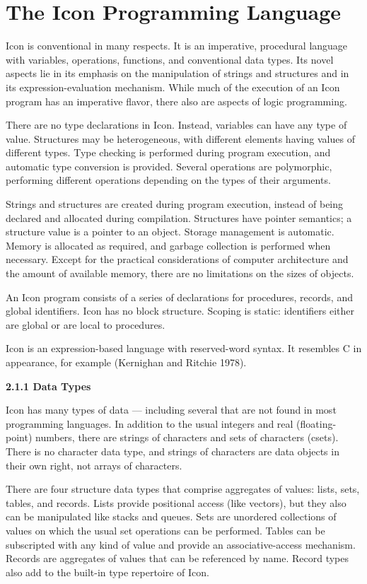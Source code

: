 \section{The Icon Programming Language}

Icon is conventional in many respects. It is an imperative, procedural
language with variables, operations, functions, and conventional data
types. Its novel aspects lie in its emphasis on the manipulation of
strings and structures and in its expression-evaluation
mechanism. While much of the execution of an Icon program has an
imperative flavor, there also are aspects of logic programming.

There are no type declarations in Icon. Instead, variables can have
any type of value. Structures may be heterogeneous, with different
elements having values of different types. Type checking is performed
during program execution, and automatic type conversion is
provided. Several operations are polymorphic, performing different
operations depending on the types of their arguments.

Strings and structures are created during program execution, instead
of being declared and allocated during compilation.  Structures have
pointer semantics; a structure value is a pointer to an object.
Storage management is automatic. Memory is allocated as required, and
garbage collection is performed when necessary. Except for the
practical considerations of computer architecture and the amount of
available memory, there are no limitations on the sizes of objects.

An Icon program consists of a series of declarations for procedures,
records, and global identifiers. Icon has no block structure. Scoping
is static: identifiers either are global or are local to procedures.

Icon is an expression-based language with reserved-word syntax. It
resembles C in appearance, for example (Kernighan and Ritchie 1978).

{\sffamily\bfseries
2.1.1 Data Types}

Icon has many types of data --- including several that are not found in
most programming languages. In addition to the usual integers and real
(floating-point) numbers, there are strings of characters and sets of
characters (csets). There is no character data type, and strings of
characters are data objects in their own right, not arrays of
characters.

There are four structure data types that comprise aggregates of
values: lists, sets, tables, and records. Lists provide positional
access (like vectors), but they also can be manipulated like stacks
and queues. Sets are unordered collections of values on which the
usual set operations can be performed. Tables can be subscripted with
any kind of value and provide an associative-access mechanism. Records
are aggregates of values that can be referenced by name.  Record types
also add to the built-in type repertoire of Icon.

